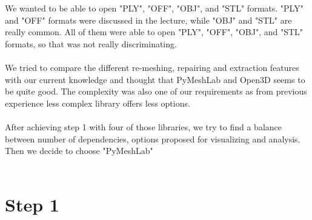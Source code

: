 \documentclass[10pt,twocolumn,letterpaper]{article}
\begin{document}
	We wanted to be able to open "PLY", "OFF", "OBJ", and "STL" formats. "PLY" and "OFF" formats were discussed in the lecture, while "OBJ" and "STL" are really common. All of them were able to open "PLY", "OFF", "OBJ", and "STL" formats, so that was not really discriminating. \\ \\
	We tried to compare the different re-meshing, repairing and extraction features with our current knowledge and thought that PyMeshLab and Open3D seems to be quite good. The complexity was also one of our requirements as from previous experience less complex library offers less options. \\ \\
	After achieving step 1 with four of those libraries, we try to find a balance between number of dependencies, options proposed for visualizing and analysis. Then we decide to choose "PyMeshLab"\cite{pymeshlab} \\ \\

\section{Step 1}
\end{document}
